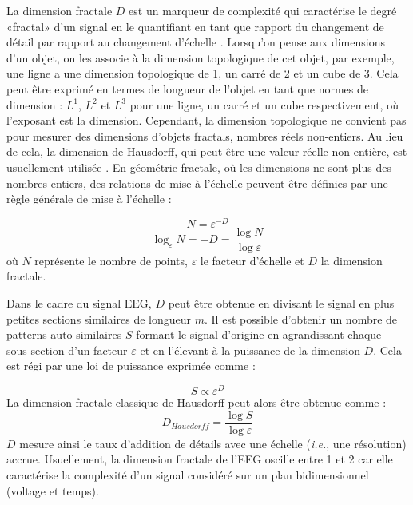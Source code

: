 La dimension fractale $D$ est un marqueur de complexité qui caractérise le degré «fractal» d'un signal en le quantifiant en tant que rapport du changement de détail par rapport au changement d'échelle \citep{goh2005comparison, klonowski2002complexity}. 
Lorsqu'on pense aux dimensions d'un objet, on les associe à la dimension topologique de cet objet, par exemple, une ligne a une dimension topologique de 1, un carré de 2 et un cube de 3. 
Cela peut être exprimé en termes de longueur de l'objet en tant que normes de dimension : $L^1$, $L^2$ et $L^3$ pour une ligne, un carré et un cube respectivement, où l'exposant est la dimension. 
Cependant, la dimension topologique ne convient pas pour mesurer des dimensions d'objets fractals, nombres réels non-entiers. 
Au lieu de cela, la dimension de Hausdorff, qui peut être une valeur réelle non-entière, est usuellement utilisée \citep{hausdorff1918dimension}. 
En géométrie fractale, où les dimensions ne sont plus des nombres entiers, des relations de mise à l'échelle peuvent être définies par une règle générale de mise à l'échelle :

\begin{equation}
N = \varepsilon^{-D}
\end{equation}
\begin{equation}
\log_\varepsilon N = -D = \frac{\log N}{\log \varepsilon}
\end{equation}
où $N$ représente le nombre de points, $\varepsilon$ le facteur d'échelle et $D$ la dimension fractale.

Dans le cadre du signal EEG, $D$ peut être obtenue en divisant le signal en plus petites sections similaires de longueur $m$. 
Il est possible d'obtenir un nombre de patterns auto-similaires $S$ formant le signal d'origine en agrandissant chaque sous-section d'un facteur $\varepsilon$ et en l’élevant à la puissance de la dimension $D$. 
Cela est régi par une loi de puissance exprimée comme :

\begin{equation}
S \propto \varepsilon^D
\end{equation}
La dimension fractale classique de Hausdorff peut alors être obtenue comme :
\begin{equation}
D_{Hausdorff} = \frac{\log S}{ \log \varepsilon}
\end{equation}
$D$ mesure ainsi le taux d’addition de détails avec une échelle (\textit{i.e.}, une résolution) accrue. 
Usuellement, la dimension fractale de l'EEG oscille entre 1 et 2 car elle caractérise la complexité d'un signal considéré sur un plan bidimensionnel (voltage et temps). 


